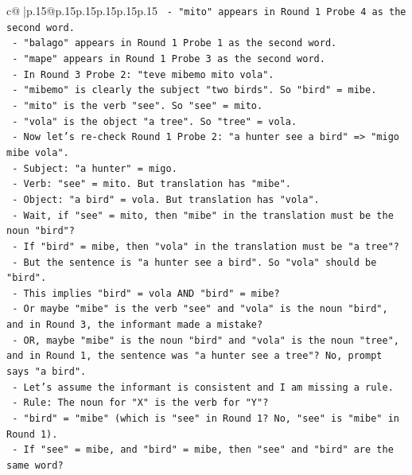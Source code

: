 \documentclass{article}
\begin{document}
{\begin{supertabular}{c@{$\;$}|p{.15\linewidth}@{}p{.15\linewidth}p{.15\linewidth}p{.15\linewidth}p{.15\linewidth}p{.15\linewidth}}
{{{\texttt{  {-} "mito" appears in Round 1 Probe 4 as the second word.} \\
\texttt{  {-} "balago" appears in Round 1 Probe 1 as the second word.} \\
\texttt{  {-} "mape" appears in Round 1 Probe 3 as the second word.} \\
\texttt{  {-} In Round 3 Probe 2: "teve mibemo mito vola".} \\
\texttt{    {-} "mibemo" is clearly the subject "two birds". So "bird" = mibe.} \\
\texttt{    {-} "mito" is the verb "see". So "see" = mito.} \\
\texttt{    {-} "vola" is the object "a tree". So "tree" = vola.} \\
\texttt{  {-} Now let's re{-}check Round 1 Probe 2: "a hunter see a bird" => "migo mibe vola".} \\
\texttt{    {-} Subject: "a hunter" = migo.} \\
\texttt{    {-} Verb: "see" = mito. But translation has "mibe".} \\
\texttt{    {-} Object: "a bird" = vola. But translation has "vola".} \\
\texttt{    {-} Wait, if "see" = mito, then "mibe" in the translation must be the noun "bird"?} \\
\texttt{    {-} If "bird" = mibe, then "vola" in the translation must be "a tree"?} \\
\texttt{    {-} But the sentence is "a hunter see a bird". So "vola" should be "bird".} \\
\texttt{    {-} This implies "bird" = vola AND "bird" = mibe?} \\
\texttt{    {-} Or maybe "mibe" is the verb "see" and "vola" is the noun "bird", and in Round 3, the informant made a mistake?} \\
\texttt{    {-} OR, maybe "mibe" is the noun "bird" and "vola" is the noun "tree", and in Round 1, the sentence was "a hunter see a tree"? No, prompt says "a bird".} \\
\texttt{    {-} Let's assume the informant is consistent and I am missing a rule.} \\
\texttt{    {-} Rule: The noun for "X" is the verb for "Y"?} \\
\texttt{      {-} "bird" = "mibe" (which is "see" in Round 1? No, "see" is "mibe" in Round 1).} \\
\texttt{      {-} If "see" = mibe, and "bird" = mibe, then "see" and "bird" are the same word?} \\
}}}
\end{supertabular}}
\end{document}
